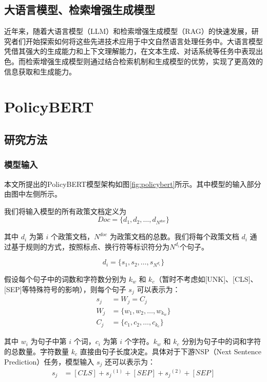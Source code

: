\documentclass[12pt, a4paper]{ctexart}
\begin{document}
\subsection{大语言模型、检索增强生成模型}
近年来，随着大语言模型（LLM）和检索增强生成模型（RAG）的快速发展，研究者们开始探索如何将这些先进技术应用于中文自然语言处理任务中。大语言模型凭借其强大的生成能力和上下文理解能力，在文本生成、对话系统等任务中表现出色。而检索增强生成模型则通过结合检索机制和生成模型的优势，实现了更高效的信息获取和生成能力。

\section{PolicyBERT}
\subsection{研究方法}

\subsubsection{模型输入}
本文所提出的PolicyBERT模型架构如图\ref{fig:policybert}所示。其中模型的输入部分由图中左侧所示。

我们将输入模型的所有政策文档定义为 
\begin{equation}
    Doc = \{d_1, d_2, \dots, d_{N^{doc}}\} 
\end{equation}

其中 $d_i$ 为第 $i$ 个政策文档，${N^{doc}}$ 为政策文档的总数。我们将每个政策文档 $d_i$ 通过基于规则的方式，按照标点、换行符等标识符分为$N^{d_i}$个句子。 

\begin{equation}
   d_i = \{s_1, s_2, \dots, s_{N^{d_i}}\} 
\end{equation}

假设每个句子中的词数和字符数分别为 $k_w$ 和 $k_c$（暂时不考虑如[UNK]、[CLS]、[SEP]等特殊符号的影响），则每个句子 $s_j$ 可以表示为：
\begin{equation}
    \begin{split}
        s_j &= W_j = C_j \\
        W_j &= \{w_1, w_2, \dots, w_{k_w}\} \\
        C_j &= \{c_1, c_2, \dots, c_{k_c}\}
    \end{split}
\end{equation}

其中 $w_i$ 为句子中第 $i$ 个词，$c_i$ 为第 $i$ 个字符。$k_w$ 和 $k_c$ 分别为句子中的词和字符的总数量。字符数量 $k_c$ 直接由句子长度决定。具体对于下游NSP（Next Sentence Prediction）任务，模型输入 $s_j$ 还可以表示为：
\begin{equation}
    \begin{split}
        s_j &= [CLS] + {s_j}^{(1)} + [SEP] + {s_j}^{(2)} + [SEP] \\
    \end{split}
\end{equation} 
\end{document}
